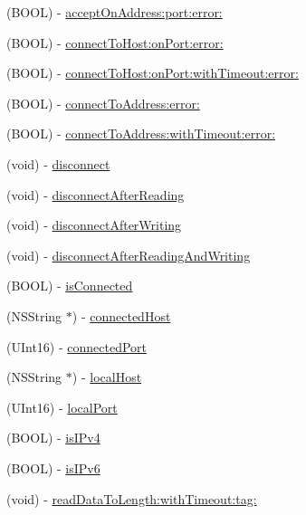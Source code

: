 \begin{DoxyCompactItemize}
\item 
(BOOL) -\/ \hyperlink{interface_async_t_c_p_socket_a9e29595f4033e87a634c9160a7ad4a4e}{acceptOnAddress:port:error:}
\item 
(BOOL) -\/ \hyperlink{interface_async_t_c_p_socket_a4e2b5a931c78d066965bdf235337b462}{connectToHost:onPort:error:}
\item 
(BOOL) -\/ \hyperlink{interface_async_t_c_p_socket_adccaaf1127cdb2344954f8c8f764a48c}{connectToHost:onPort:withTimeout:error:}
\item 
(BOOL) -\/ \hyperlink{interface_async_t_c_p_socket_a2e1af5ef7a3e1ee37613dddb7c0e0617}{connectToAddress:error:}
\item 
(BOOL) -\/ \hyperlink{interface_async_t_c_p_socket_ae023e135c607e4ad8a7dd86a1be7efe2}{connectToAddress:withTimeout:error:}
\item 
(void) -\/ \hyperlink{interface_async_t_c_p_socket_a960705de531a20389fb29928d43258c3}{disconnect}
\item 
(void) -\/ \hyperlink{interface_async_t_c_p_socket_a9c49760a3286a595f3cdc0702733baed}{disconnectAfterReading}
\item 
(void) -\/ \hyperlink{interface_async_t_c_p_socket_a40c9570c2e696d6c48347024fa1f8b5c}{disconnectAfterWriting}
\item 
(void) -\/ \hyperlink{interface_async_t_c_p_socket_a31e39568995cdc85c4feb5a76c645d5f}{disconnectAfterReadingAndWriting}
\item 
(BOOL) -\/ \hyperlink{interface_async_t_c_p_socket_ad3515f7fe2b8ed2b9e14233cf7ede0bc}{isConnected}
\item 
(NSString $\ast$) -\/ \hyperlink{interface_async_t_c_p_socket_a918b8d6a97c1f0a2cd938cc61d3ff353}{connectedHost}
\item 
(UInt16) -\/ \hyperlink{interface_async_t_c_p_socket_a2337a76e32d4e2836888e58723977b7e}{connectedPort}
\item 
(NSString $\ast$) -\/ \hyperlink{interface_async_t_c_p_socket_a544fa124053aea063a8be148cf24d491}{localHost}
\item 
(UInt16) -\/ \hyperlink{interface_async_t_c_p_socket_a1b6cdcf368d68e9ffb28e359e5c23ce8}{localPort}
\item 
(BOOL) -\/ \hyperlink{interface_async_t_c_p_socket_a7f1734034c9aa5b62cfeb69f203729e3}{isIPv4}
\item 
(BOOL) -\/ \hyperlink{interface_async_t_c_p_socket_aa009ac699bce64f1d087a0eafeb2a371}{isIPv6}
\item 
(void) -\/ \hyperlink{interface_async_t_c_p_socket_a8478e9a2d87f7a6d10b382dce90905b7}{readDataToLength:withTimeout:tag:}

\end{DoxyCompactItemize}
